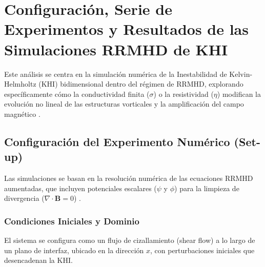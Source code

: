 
\section{Configuración, Serie de Experimentos y Resultados de las Simulaciones RRMHD de KHI}

Este análisis se centra en la simulación numérica de la Inestabilidad de Kelvin-Helmholtz (KHI) bidimensional dentro del régimen de RRMHD, explorando específicamente cómo la conductividad finita ($\sigma$) o la resistividad ($\eta$) modifican la evolución no lineal de las estructuras vorticales y la amplificación del campo magnético \cite{390}.

\subsection{Configuración del Experimento Numérico (Set-up)}
Las simulaciones se basan en la resolución numérica de las ecuaciones RRMHD aumentadas, que incluyen potenciales escalares ($\psi$ y $\phi$) para la limpieza de divergencia ($\nabla \cdot \mathbf{B} = 0$) \cite{336, 392}.

\subsubsection{Condiciones Iniciales y Dominio}
El sistema se configura como un flujo de cizallamiento (shear flow) a lo largo de un plano de interfaz, ubicado en la dirección $x$, con perturbaciones iniciales que desencadenan la KHI.

